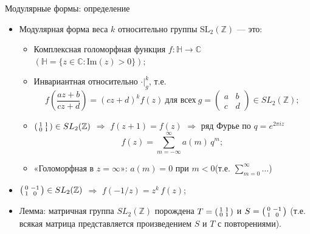 \documentclass[serif, aspectratio=169]{beamer}
\begin{document}
\begin{frame}{Модулярные формы: определение}
    \begin{itemize}
        \item Модулярная форма веса $k$ относительно группы $\mathrm{SL}_2(\mathbb{Z})$ --- это:
        \begin{itemize}
            \item Комплексная голоморфная функция $f:\mathbb{H}\to\mathbb{C}$ \quad $(\mathbb{H} = \{z \in \mathbb{C} : \mathrm{Im}(z) > 0\});$
            \item Инвариантная относительно $\cdot |_g^k$, т.е.
            \[f\!\left(\frac{az+b}{cz+d}\right) = (cz+d)^k f(z)\ \text{для всех}\ g=\begin{pmatrix}a&b\\c&d\end{pmatrix}\in SL_2(\mathbb{Z});\]
            \item $\begin{psmallmatrix}1&1\\0&1\end{psmallmatrix} \in SL_2(\mathbb{Z})$ $\Rightarrow$ $f(z+1)=f(z)$ $\Rightarrow$ ряд Фурье по $q = e^{2\pi i z}$
            \[f(z) = \sum_{m=-\infty}^\infty a(m)\,q^m;\]
            \item «Голоморфная в $z=\infty$»: $a(m)=0$ при $m<0$\quad (т.е. $\sum_{m=0}^\infty \dots$)
        \end{itemize}
        \item $\begin{psmallmatrix}0&-1\\1&0\end{psmallmatrix} \in SL_2(\mathbb{Z})$ $\Rightarrow$ $f(-1/z)=z^k\,f(z)$;
        \item Лемма: матричная группа $SL_2(\mathbb{Z})$ порождена $T=\begin{psmallmatrix}1&1\\0&1\end{psmallmatrix}$ и $S=\begin{psmallmatrix}0&-1\\1&0\end{psmallmatrix}$ (т.е. всякая матрица представляется произведением $S$ и $T$ с повторениями).
    \end{itemize}


\end{frame}
\end{document}
